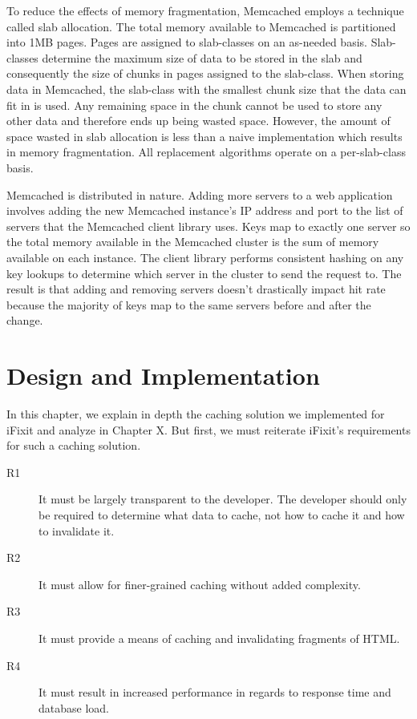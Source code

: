 \documentclass[12pt]{ucthesis}
\begin{document}
To reduce the effects of memory fragmentation, \textsf{Memcached} employs a technique called slab allocation.
The total memory available to \textsf{Memcached} is partitioned into 1MB pages.
Pages are assigned to slab-classes on an as-needed basis.
Slab-classes determine the maximum size of data to be stored in the slab and consequently the size of chunks in pages assigned to the slab-class.
When storing data in \textsf{Memcached}, the slab-class with the smallest chunk size that the data can fit in is used.
Any remaining space in the chunk cannot be used to store any other data and therefore ends up being wasted space.
However, the amount of space wasted in slab allocation is less than a naive implementation which results in memory fragmentation.
All replacement algorithms operate on a per-slab-class basis.

\textsf{Memcached} is distributed in nature.
Adding more servers to a web application involves adding the new \textsf{Memcached} instance's IP address and port to the list of servers that the \textsf{Memcached} client library uses.
Keys map to exactly one server so the total memory available in the \textsf{Memcached} cluster is the sum of memory available on each instance.
The client library performs consistent hashing\cite{consistentHashing} on any key lookups to determine which server in the cluster to send the request to.
The result is that adding and removing servers doesn't drastically impact hit rate because the majority of keys map to the same servers before and after the change.


\chapter{Design and Implementation}
\label{designAndImplementation}
In this chapter, we explain in depth the caching solution we implemented for \textsf{iFixit} and analyze in Chapter X.
But first, we must reiterate \textsf{iFixit}'s requirements for such a caching solution.

\begin{description}
   \item[R1] It must be largely transparent to the developer.
             The developer should only be required to determine what data to cache, not how to cache it and how to invalidate it.
   \item[R2] It must allow for finer-grained caching without added complexity.
   \item[R3] It must provide a means of caching and invalidating fragments of HTML.
   \item[R4] It must result in increased performance in regards to response time and database load.
\end{description}
\end{document}

